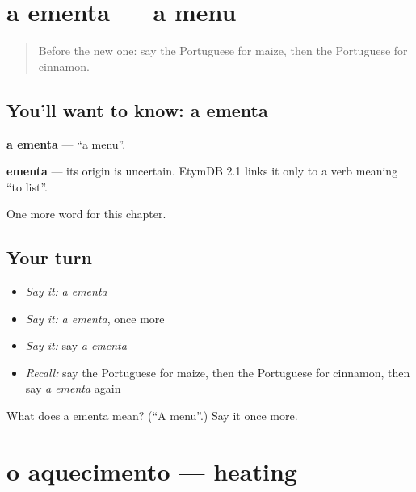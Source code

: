 \section[a ementa]{a ementa — a menu}

\label{lesson:PT-C199-ementa}



\begin{quote}
Before the new one: say the Portuguese for maize, then the Portuguese for cinnamon.
\end{quote}

\subsection*{You'll want to know: a ementa}
\textbf{a ementa} — \textquotedblleft{}a menu\textquotedblright{}.

\begin{cousinweb}
\textbf{ementa} — its origin is uncertain. EtymDB 2.1 links it only to a verb meaning \textquotedblleft{}to list\textquotedblright{}.
\end{cousinweb}

\begin{grammarlens}[title={What you've built}]
One more word for this chapter.
\end{grammarlens}

\subsection*{Your turn}
\begin{itemize}
\raggedright
  \item \emph{Say it:} \emph{a ementa}
  \item \emph{Say it:} \emph{a ementa}, once more
  \item \emph{Say it:} say \emph{a ementa}
  \item \emph{Recall:} say the Portuguese for maize, then the Portuguese for cinnamon, then say \emph{a ementa} again
\end{itemize}

\begin{tcolorbox}[breakable,colback=teal!4,colframe=teal!35!black,title={Before you move on}]
What does a ementa mean? (\textquotedblleft{}A menu\textquotedblright{}.) Say it once more.
\end{tcolorbox}
\section[o aquecimento]{o aquecimento — heating}

